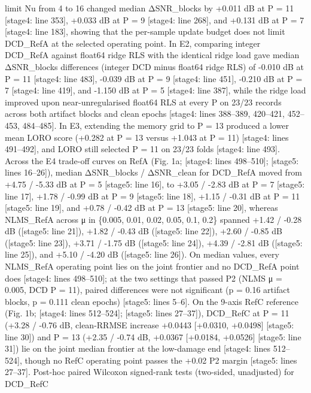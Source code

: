 \documentclass[
  9pt,
]{article}
\begin{document}
limit Nu from 4 to 16 changed median ΔSNR\_blocks by +0.011 dB at P = 11
{[}stage4: line 353{]}, +0.033 dB at P = 9 {[}stage4: line 268{]}, and
+0.131 dB at P = 7 {[}stage4: line 183{]}, showing that the per-sample
update budget does not limit DCD\_RefA at the selected operating point.
In E2, comparing integer DCD\_RefA against float64 ridge RLS with the
identical ridge load gave median ΔSNR\_blocks differences (integer DCD
minus float64 ridge RLS) of -0.010 dB at P = 11 {[}stage4: line 483{]},
-0.039 dB at P = 9 {[}stage4: line 451{]}, -0.210 dB at P = 7 {[}stage4:
line 419{]}, and -1.150 dB at P = 5 {[}stage4: line 387{]}, while the
ridge load improved upon near-unregularised float64 RLS at every P on
23/23 records across both artifact blocks and clean epochs {[}stage4:
lines 388--389, 420--421, 452--453, 484--485{]}. In E3, extending the
memory grid to P = 13 produced a lower mean LORO score (+0.282 at P = 13
versus +1.043 at P = 11) {[}stage4: lines 491--492{]}, and LORO still
selected P = 11 on 23/23 folds {[}stage4: line 493{]}. Across the E4
trade-off curves on RefA (Fig. 1a; {[}stage4: lines 498--510{]};
{[}stage5: lines 16--26{]}), median ΔSNR\_blocks / ΔSNR\_clean for
DCD\_RefA moved from +4.75 / -5.33 dB at P = 5 {[}stage5: line 16{]}, to
+3.05 / -2.83 dB at P = 7 {[}stage5: line 17{]}, +1.78 / -0.99 dB at P =
9 {[}stage5: line 18{]}, +1.15 / -0.31 dB at P = 11 {[}stage5: line
19{]}, and +0.78 / -0.42 dB at P = 13 {[}stage5: line 20{]}, whereas
NLMS\_RefA across μ in \{0.005, 0.01, 0.02, 0.05, 0.1, 0.2\} spanned
+1.42 / -0.28 dB ({[}stage5: line 21{]}), +1.82 / -0.43 dB ({[}stage5:
line 22{]}), +2.60 / -0.85 dB ({[}stage5: line 23{]}), +3.71 / -1.75 dB
({[}stage5: line 24{]}), +4.39 / -2.81 dB ({[}stage5: line 25{]}), and
+5.10 / -4.20 dB ({[}stage5: line 26{]}). On median values, every
NLMS\_RefA operating point lies on the joint frontier and no DCD\_RefA
point does {[}stage4: lines 498--510{]}; at the two settings that passed
P2 (NLMS μ = 0.005, DCD P = 11), paired differences were not significant
(p = 0.16 artifact blocks, p = 0.111 clean epochs) {[}stage5: lines
5--6{]}. On the 9-axis RefC reference (Fig. 1b; {[}stage4: lines
512--524{]}; {[}stage5: lines 27--37{]}), DCD\_RefC at P = 11 (+3.28 /
-0.76 dB, clean-RRMSE increase +0.0443 {[}+0.0310, +0.0498{]} {[}stage5:
line 30{]}) and P = 13 (+2.35 / -0.74 dB, +0.0367 {[}+0.0184, +0.0526{]}
{[}stage5: line 31{]}) lie on the joint median frontier at the
low-damage end {[}stage4: lines 512--524{]}, though no RefC operating
point passes the +0.02 P2 margin {[}stage5: lines 27--37{]}. Post-hoc
paired Wilcoxon signed-rank tests (two-sided, unadjusted) for DCD\_RefC
\end{document}
